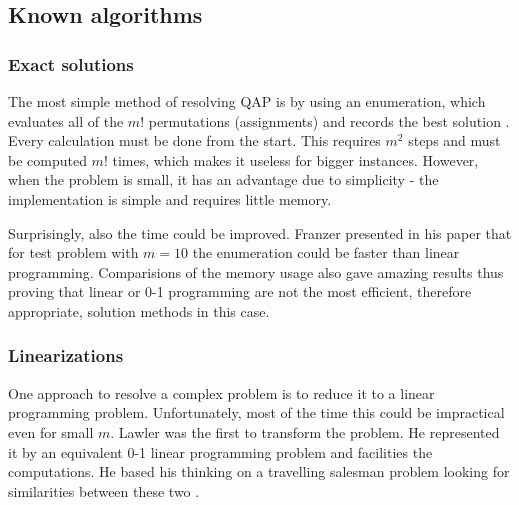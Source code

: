 \subsection{Known algorithms}
\subsubsection{Exact solutions}

The most simple method of resolving QAP is by using an enumeration, which evaluates all of the $m!$ permutations (assignments) and records the best solution \cite{frazer1997602}.
Every calculation must be done from the start.
This requires $m^2$ steps and must be computed $m!$ times, which makes it useless for bigger instances.
However, when the problem is small, it has an advantage due to simplicity - the implementation is simple and requires little memory.

Surprisingly, also the time could be improved. Franzer presented in his paper \cite{frazer1997602} that for test problem with $m=10$ the enumeration could be faster than linear programming. Comparisions of the memory usage also gave amazing results thus proving that linear or 0-1 programming are not the most efficient, therefore appropriate, solution methods in this case.

\subsubsection{Linearizations}
One approach to resolve a complex problem is to reduce it to a linear programming problem.
Unfortunately, most of the time this could be impractical even for small $m$. Lawler \cite{lawler1963} was the first to transform the problem. He represented it by an equivalent 0-1 linear programming problem and facilities the computations. He based his thinking on a travelling salesman problem looking for similarities between these two \cite{charnsethikul1988exact}.

